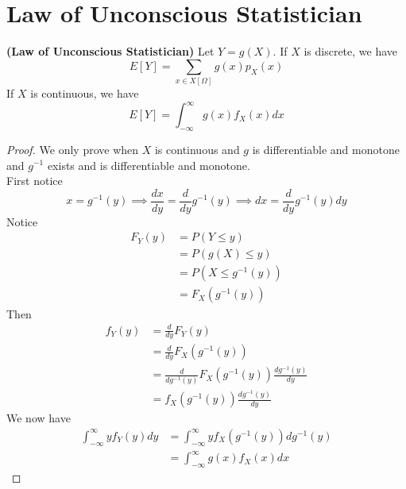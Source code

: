 \documentclass{report}
\begin{document}
\section{Law of Unconscious Statistician}
\begin{theorem}
\label{2.1.1}
\textbf{(Law of Unconscious Statistician)} Let $Y=g(X)$. If $X$ is discrete, we have
\begin{equation}
E[Y]=\sum_{x\in X[\Omega]} g(x)p_X(x)
\end{equation}
If $X$ is continuous, we have
\begin{equation}
E[Y]=\int_{-\infty}^\infty g(x)f_X(x)dx
\end{equation}
\end{theorem}
\begin{proof}
We only prove when $X$ is continuous and $g$ is differentiable and monotone and $g^{-1}$ exists and is differentiable and monotone.\\

First notice
\begin{equation}
x=g^{-1}(y)\implies \frac{dx}{dy}=\frac{d}{dy}g^{-1}(y)\implies dx=\frac{d}{dy}g^{-1}(y)dy
\end{equation}
Notice
\begin{align}
F_Y(y)&=P(Y\leq y)\\
&=P(g(X)\leq y)\\
&=P(X\leq g^{-1}(y))\\
&=F_X(g^{-1}(y))
\end{align}
Then 
\begin{align}
f_Y(y)&= \frac{d}{dy}F_Y(y)\\
&=\frac{d}{dy}F_X(g^{-1}(y))\\
&=\frac{d}{dg^{-1}(y)}F_X(g^{-1}(y)) \frac{dg^{-1}(y)}{dy}\\
&=f_X(g^{-1}(y)) \frac{dg^{-1}(y)}{dy}
\end{align}
We now have
\begin{align}
\int_{-\infty}^\infty yf_Y(y)dy &=\int_{-\infty}^\infty yf_X(g^{-1}(y)) dg^{-1}(y)\\
&=\int_{-\infty}^\infty g(x)f_X(x)dx
\end{align}

\end{proof}
\end{document}
